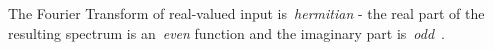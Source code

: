 %
The Fourier Transform of real-valued input is~\emph{hermitian} - the real part of the resulting spectrum
is an~\emph{even} function and the imaginary part is~\emph{odd}~\citep{book:bracewell2000fourier}.
